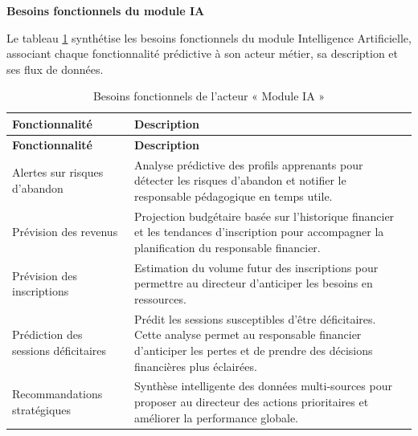 \noindent\textbf{Besoins fonctionnels du module IA}

\vspace{0.3cm}


\noindent Le tableau \ref{tab:Besoins fonctionnels de l’acteur « Module IA »} synthétise les besoins fonctionnels du module Intelligence Artificielle, associant chaque fonctionnalité prédictive à son acteur métier, sa description et ses flux de données.
\begin{longtable}{|p{4.5cm}|p{11cm}|}
\caption{Besoins fonctionnels de l’acteur « Module IA »}
\label{tab:Besoins fonctionnels de l’acteur « Module IA »} \\

\hline
\textbf{Fonctionnalité} & \textbf{Description} \\
\hline
\endfirsthead

\hline
\textbf{Fonctionnalité} & \textbf{Description} \\
\hline
\endhead

Alertes sur risques d'abandon &
Analyse prédictive des profils apprenants pour détecter les risques d'abandon et notifier le responsable pédagogique en temps utile.\\
\hline

Prévision des revenus &
Projection budgétaire basée sur l'historique financier et les tendances d'inscription pour accompagner la planification du responsable financier.\\
\hline

Prévision des inscriptions &
Estimation du volume futur des inscriptions pour permettre au directeur d'anticiper les besoins en ressources.\\
\hline

Prédiction des sessions déficitaires &
Prédit les sessions susceptibles d’être déficitaires. Cette analyse permet au responsable financier d’anticiper les pertes et de prendre des décisions financières plus éclairées.\\
\hline

Recommandations stratégiques &
Synthèse intelligente des données multi-sources pour proposer au directeur des actions prioritaires et améliorer la performance globale.\\
\hline

\end{longtable}










